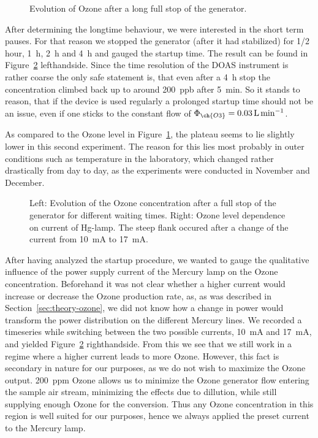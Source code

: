 \begin{figure}[htbp]
  \centering
  
  \caption{Evolution of Ozone after a long full stop of the
    generator.}
  \label{fig:long-stop}
\end{figure}

After determining the longtime behaviour, we were interested in the
short term pauses. For that reason we stopped the generator (after it
had stabilized) for {\nfrac{} 1/2} \si{hour}, \SI{1}{\hour},
\SI{2}{\hour} and \SI{4}{\hour} and gauged the startup time. The
result can be found in Figure~\ref{fig:multiple-stop}
lefthandside. Since the time resolution of the DOAS instrument is
rather coarse the only safe statement is, that even after a
\SI{4}{\hour} stop the concentration climbed back up to around
\SI{200}{ppb} after \SI{5}{\minute}. So it stands to reason, that if
the device is used regularly a prolonged startup time should not be an
issue, even if one sticks to the constant flow of $\Phi_{\ch{O3}} =
\SI{0.03}{\liter\per\minute}$.

As compared to the Ozone level in Figure~\ref{fig:long-stop}, the
plateau seems to lie slightly lower in this second experiment. The
reason for this lies most probably in outer conditions such as
temperature in the laboratory, which changed rather drastically from
day to day, as the experiments were conducted in November and
December.

\begin{figure}[htbp]
  \centering
  
  \hfill
  
  \caption{Left: Evolution of the Ozone concentration after a full stop of the
    generator for different waiting times. Right: Ozone level
    dependence on current of Hg-lamp. The steep
    flank occured after a change of the current from
    \SI{10}{\milli\ampere} to \SI{17}{\milli\ampere}.}
  \label{fig:multiple-stop}
\end{figure}

After having analyzed the startup procedure, we wanted to gauge the
qualitative influence of the power supply current of the Mercury lamp
on the Ozone concentration. Beforehand it was not clear whether a
higher current would increase or decrease the Ozone production rate,
as, as was described in Section~\ref{sec:theory-ozone}, we did not
know how a change in power would transform the power distribution on
the different Mercury lines. We recorded a timeseries while switching
between the two possible currents, \SI{10}{\milli\ampere} and
\SI{17}{\milli\ampere}, and yielded Figure~\ref{fig:multiple-stop}
righthandside. From this we see that we still work in a regime where a
higher current leads to more Ozone. However, this fact is secondary in
nature for our purposes, as we do not wish to maximize the Ozone
output. \SI{200}{ppm} Ozone allows us to minimize the Ozone generator
flow entering the sample air stream, minimizing the effects due to
dillution, while still supplying enough Ozone for the conversion. Thus
any Ozone concentration in this region is well suited for our
purposes, hence we always applied the preset current to the Mercury
lamp. 


